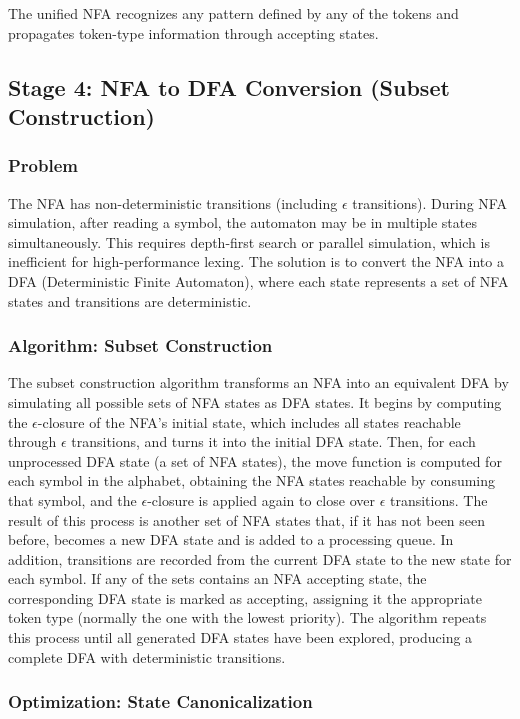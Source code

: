 \documentclass[12pt,a4paper]{report}
\begin{document}
The unified NFA recognizes any pattern defined by any of the tokens and propagates token-type information through accepting states.

\subsection{Stage 4: NFA to DFA Conversion (Subset Construction)}

\subsubsection{Problem}

The NFA has non-deterministic transitions (including $\epsilon$ transitions).
During NFA simulation, after reading a symbol, the automaton may be in multiple states simultaneously.
This requires depth-first search or parallel simulation, which is inefficient for high-performance lexing.
The solution is to convert the NFA into a DFA (Deterministic Finite Automaton), where each state represents a set of NFA states and transitions are deterministic.

\subsubsection{Algorithm: Subset Construction}
The subset construction algorithm transforms an NFA into an equivalent DFA by simulating
all possible sets of NFA states as DFA states.
It begins by computing the $\epsilon$-closure of the NFA's initial state,
which includes all states reachable through $\epsilon$ transitions, and turns it into the initial DFA state.
Then, for each unprocessed DFA state (a set of NFA states), the move function is computed for each symbol
in the alphabet, obtaining the NFA states reachable by consuming that symbol, and the $\epsilon$-closure is applied again to
close over $\epsilon$ transitions.
The result of this process is another set of
NFA states that, if it has not been seen before, becomes a new DFA state
and is added to a processing queue.
In addition, transitions are recorded from the current
DFA state to the new state for each symbol.
If any of the sets
contains an NFA accepting state, the corresponding DFA state is marked as accepting, assigning it the appropriate token type (normally the one with the lowest priority).
The algorithm repeats this process until all generated DFA states have been explored, producing a complete DFA with deterministic transitions.

\subsubsection{Optimization: State Canonicalization}
\end{document}
